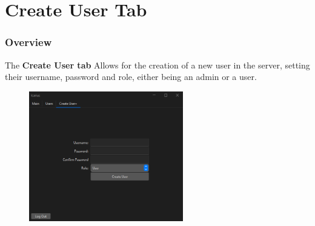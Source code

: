 \section{Create User Tab}
\subsubsection{Overview}
The \textbf{Create User tab} Allows for the creation of a new user in the server, setting their username, password and role, either being an admin or a user.

\begin{figure}[H]
    \centering
    \includegraphics[width=0.6\textwidth]{CreateUserTab/createUserOverview.PNG}
\end{figure}

